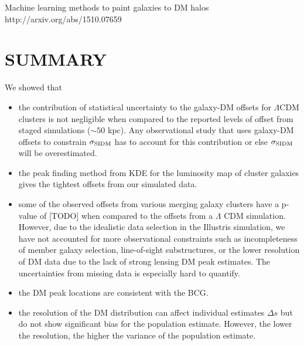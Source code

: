  
 
 
 
Machine learning methods to paint galaxies to DM halos 
http://arxiv.org/abs/1510.07659


\section{SUMMARY}
We showed that 
\begin{itemize}
		\item the contribution of statistical uncertainty to the galaxy-DM offsets 
			for $\Lambda$CDM clusters is not negligible when compared to the reported
			levels of offset from staged simulations ($\sim 50$ kpc). Any
			observational study that uses 
			galaxy-DM offsets to
			constrain $\sigma_{\rm SIDM}$ has to account for this contribution
			or else $\sigma_{\rm SIDM}$ will be overestimated.
		\item  the peak finding method from KDE for the luminosity map of cluster
			galaxies gives the tightest offsets from our simulated data. 

		\item some of the observed offsets from various merging galaxy clusters 
			have a p-value of [TODO]  when compared to the offsets from a  
			$\Lambda$ CDM simulation. However, due to the idealistic data selection
			in the Illustris simulation, we have not accounted for more
			observational constraints such as incompleteness of member galaxy 
			selection, 
			line-of-sight substructures, or the lower resolution of DM data due to the
			lack of strong lensing DM peak estimates. The uncertainties from missing
			data is especially hard to quantify. 

		\item the DM peak locations are consistent with the BCG.  

		\item the resolution of the DM distribution can affect
			individual estimates $\Delta s$ but do not show significant bias for
			the population estimate. However, the lower the resolution, the higher
			the variance of the population estimate.  

\end{itemize}

